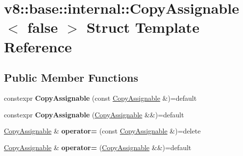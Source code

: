 \hypertarget{structv8_1_1base_1_1internal_1_1CopyAssignable_3_01false_01_4}{}\section{v8\+:\+:base\+:\+:internal\+:\+:Copy\+Assignable$<$ false $>$ Struct Template Reference}
\label{structv8_1_1base_1_1internal_1_1CopyAssignable_3_01false_01_4}
\subsection*{Public Member Functions}
\begin{DoxyCompactItemize}
\item 
\mbox{\label{structv8_1_1base_1_1internal_1_1CopyAssignable_3_01false_01_4_a238b24eea724b7922326bba670b0d705}} 
constexpr {\bfseries Copy\+Assignable} (const \mbox{\hyperlink{structv8_1_1base_1_1internal_1_1CopyAssignable}{Copy\+Assignable}} \&)=default
\item 
\mbox{\label{structv8_1_1base_1_1internal_1_1CopyAssignable_3_01false_01_4_a84a1bb4354c4fcd43fa67437d0f4bf8f}} 
constexpr {\bfseries Copy\+Assignable} (\mbox{\hyperlink{structv8_1_1base_1_1internal_1_1CopyAssignable}{Copy\+Assignable}} \&\&)=default
\item 
\mbox{\label{structv8_1_1base_1_1internal_1_1CopyAssignable_3_01false_01_4_ad4fb88d92ea19ab125f8e53e871015c7}} 
\mbox{\hyperlink{structv8_1_1base_1_1internal_1_1CopyAssignable}{Copy\+Assignable}} \& {\bfseries operator=} (const \mbox{\hyperlink{structv8_1_1base_1_1internal_1_1CopyAssignable}{Copy\+Assignable}} \&)=delete
\item 
\mbox{\label{structv8_1_1base_1_1internal_1_1CopyAssignable_3_01false_01_4_aa663045e485a733276669f3904bbe086}} 
\mbox{\hyperlink{structv8_1_1base_1_1internal_1_1CopyAssignable}{Copy\+Assignable}} \& {\bfseries operator=} (\mbox{\hyperlink{structv8_1_1base_1_1internal_1_1CopyAssignable}{Copy\+Assignable}} \&\&)=default
\end{DoxyCompactItemize}


